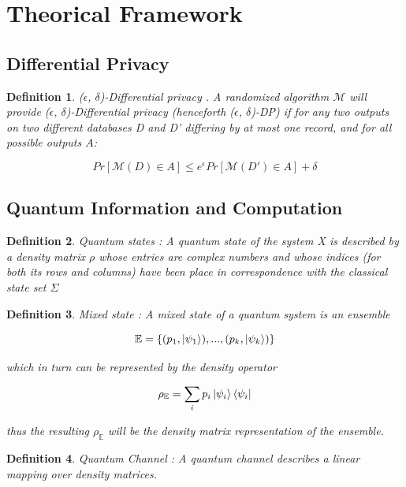 \documentclass[11pt]{article}
\newtheorem{definition}{Definition}[section]
\begin{document}
\section{Theorical Framework}

\subsection{Differential Privacy}

\begin{definition}
    ($\epsilon$, $\delta$)-Differential privacy \cite{dwork2014algorithmic}. A randomized algorithm $\mathcal{M}$ will provide ($\epsilon$, $\delta$)-Differential privacy (henceforth ($\epsilon$, $\delta$)-DP) if for any two outputs on two different databases D and D' differing by at most one record, and for all possible outputs $A$:

    $$Pr[\mathcal{M}(D) \in A] \leq e^{\epsilon}Pr[\mathcal{M}(D') \in A] + \delta$$
\end{definition}


\subsection{Quantum Information and Computation}

\begin{definition}
    Quantum states \cite{watrous_quantum_channels}: A quantum state of the system X is described by a density matrix $\rho$ whose entries are complex numbers and whose indices (for both its rows and columns) have been place in correspondence with the classical state set $\Sigma$
\end{definition}

\begin{definition}
    Mixed state \cite{zhou2017differential}: A mixed state of a quantum system is an ensemble

    $$\mathbb{E} = \{(p_1,\ket{\psi_1}),...,(p_k,\ket{\psi_k})\}$$

    which in turn can be represented by the density operator

    $$\rho_{\mathbb{E}} = \sum_{i}p_i\ket{\psi_i}\bra{\psi_i}$$

    thus the resulting $\rho_{\mathbb{E}}$ will be the density matrix representation of the ensemble.
\end{definition}

\begin{definition}
    Quantum Channel \cite{watrous_quantum_channels}: A quantum channel describes a linear mapping over density matrices. 
\end{definition}
\end{document}
